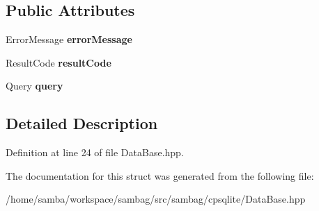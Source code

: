 \subsection*{Public Attributes}
\begin{DoxyCompactItemize}
\item 
\hypertarget{structsambag_1_1cpsqlite_1_1_data_base_query_failed_a0aa410921c0c8609bfffe8fcec23260e}{
ErrorMessage {\bfseries errorMessage}}
\label{structsambag_1_1cpsqlite_1_1_data_base_query_failed_a0aa410921c0c8609bfffe8fcec23260e}

\item 
\hypertarget{structsambag_1_1cpsqlite_1_1_data_base_query_failed_a131ba84c8139674f81f7a77f73bff87c}{
ResultCode {\bfseries resultCode}}
\label{structsambag_1_1cpsqlite_1_1_data_base_query_failed_a131ba84c8139674f81f7a77f73bff87c}

\item 
\hypertarget{structsambag_1_1cpsqlite_1_1_data_base_query_failed_add122bc0085c668d344a783e17b61321}{
Query {\bfseries query}}
\label{structsambag_1_1cpsqlite_1_1_data_base_query_failed_add122bc0085c668d344a783e17b61321}

\end{DoxyCompactItemize}


\subsection{Detailed Description}


Definition at line 24 of file DataBase.hpp.



The documentation for this struct was generated from the following file:\begin{DoxyCompactItemize}
\item 
/home/samba/workspace/sambag/src/sambag/cpsqlite/DataBase.hpp\end{DoxyCompactItemize}
